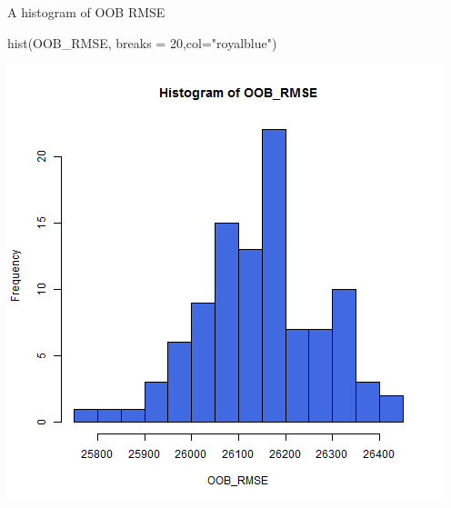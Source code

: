 \documentclass[
  10pt,
  ignorenonframetext,
]{beamer}
\newenvironment{Shaded}{}{}
\newcommand{\DataTypeTok}[1]{#1}
\newcommand{\DecValTok}[1]{#1}
\newcommand{\KeywordTok}[1]{\textcolor[rgb]{0.00,0.00,1.00}{#1}}
\newcommand{\NormalTok}[1]{#1}
\newcommand{\StringTok}[1]{\textcolor[rgb]{0.00,0.50,0.50}{#1}}
\begin{document}
\begin{frame}[fragile]{A histogram of OOB RMSE}
\protect\hypertarget{a-histogram-of-oob-rmse}{}

\begin{Shaded}
\begin{Highlighting}[]
\KeywordTok{hist}\NormalTok{(OOB_RMSE, }\DataTypeTok{breaks =} \DecValTok{20}\NormalTok{,}\DataTypeTok{col=}\StringTok{"royalblue"}\NormalTok{)}
\end{Highlighting}
\end{Shaded}

\includegraphics[width=\textwidth,height=0.75\textheight]{figure/ml_rf_hist_OOB_RMSE.png}

\end{frame}
\end{document}
